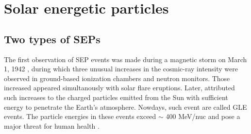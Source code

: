 



\section{Solar energetic particles}

\subsection{Two types of SEPs}


The first observation of \ac{SEP} events was made during a magnetic storm on March 1, 1942 \citep{lange1942note,forbush1942further}, during which three unusual increases in the cosmic-ray intensity were observed in ground-based ionization chambers and neutron monitors. Those increased appeared simultanously with solar flare eruptions. Later, \citet{Forbush1946} attributed such increases to the charged particles emitted from the Sun with sufficient energy to penetrate the Earth's atmosphere. Nowdays, such event are called \ac{GLE} events. The particle energies in these events exceed $\sim$ 400 MeV/nuc and pose a major threat for human health \citep{meyer1956solar,Shea2012SSRv,gopalswamy2013first,thakur2014ground, Reames2013, Mironshnichenko2013Ge}.


